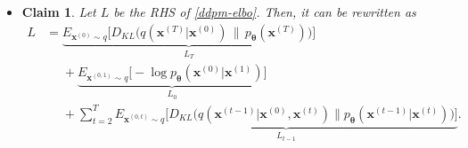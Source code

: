 \documentclass[10pt]{article}
\newtheorem{claim}[lemma]{Claim}
\newcommand{\ve}[1]{\mathbf{#1}}
\newcommand{\ves}[1]{\boldsymbol{#1}}
\begin{document}
\begin{itemize}
\begin{proof}
  \begin{align*}    
    E_{\ve{x}^{(0)} \sim q} [-\log p_{\ves{\theta}}(\ve{x}^{(0)})]
    &= E_{\ve{x}^{(0)} \sim q} \bigg[ -\log \bigg( E_{\ve{x}^{(1:T)} \sim q(\ve{x}^{(1:T)}|\ve{x}^{(0)})} \bigg[ p_{\ves{\theta}}(\ve{x}^{(T)}) \prod_{t=1}^T \frac{ p_{\ves{\theta}}(\ve{x}^{(t-1)}|\ve{x}^{(t)})}{ q(\ve{x}^{(t)}|\ve{x}^{(t-1)})} \bigg] \bigg) \bigg] \\
    &\leq E_{\ve{x}^{(0)} \sim q} \bigg[ - E_{\ve{x}^{(1:T)} \sim q(\ve{x}^{(1:T)}|\ve{x}^{(0)})} \bigg[ \log \bigg( p_{\ves{\theta}}(\ve{x}^{(T)}) \prod_{t=1}^T \frac{ p_{\ves{\theta}}(\ve{x}^{(t-1)}|\ve{x}^{(t)})}{ q(\ve{x}^{(t)}|\ve{x}^{(t-1)})} \bigg) \bigg] \bigg] \\
    &= - E_{\ve{x}^{(0:T)}\sim q}\bigg[ \log p_{\ves{\theta}}(\ve{x}^{(T)}) + \sum_{t=1}^T \log p_{\ves{\theta}}(\ve{x}^{(t-1)}|\ve{x}^{(t)}) - \sum_{t=1}^T \log q(\ve{x}^{(t)}|\ve{x}^{(t-1)}) \bigg] \\
    &= E_{\ve{x}^{(0:T)}\sim q}\bigg[ \sum_{t=1}^T \log q(\ve{x}^{(t)}|\ve{x}^{(t-1)}) - \log p_{\ves{\theta}}(\ve{x}^{(T)}) - \sum_{t=1}^T \log p_{\ves{\theta}}(\ve{x}^{(t-1)}|\ve{x}^{(t)}) \bigg] \\
    &= E_{\ve{x}^{(0:T)} \sim q}\Big[ \log q(\ve{x}^{(1:T)}|\ve{x}^{(0)}) - \log p_{\ves{\theta}}(\ve{x}^{(0:T)}) \Big]
  \end{align*}
  as required.
\end{proof}

\item \begin{claim} \label{ddpm-elbo-three-terms}
Let $L$ be the RHS of \eqref{ddpm-elbo}. Then, it can be rewritten as
\begin{align*}
  L
  &= \underbrace{E_{\ve{x}^{(0)} \sim q} \Big[ D_{KL}\big(q(\ve{x}^{(T)}|\ve{x}^{(0)})\, \big\|\, p_{\ves{\theta}}(\ve{x}^{(T)})\big) \Big]}_{L_T} \\
  &\phantom{=} + \underbrace{E_{\ve{x}^{(0,1)} \sim q} \bigg[ - \log p_{\ves{\theta}}(\ve{x}^{(0)}|\ve{x}^{(1)}) \bigg] }_{L_0} \\
  &\phantom{=} + \sum_{t = 2}^T \underbrace{E_{\ve{x}^{(0,t)}\sim q} \Big[ D_{KL}\big( q(\ve{x}^{(t-1)}|\ve{x}^{(0)},\ve{x}^{(t)})  \big\| p_{\ves{\theta}}(\ve{x}^{(t-1)}|\ve{x}^{(t)}) \big) \Big]}_{L_{t-1}}.
\end{align*}
\end{claim}


\end{itemize}
\end{document}
